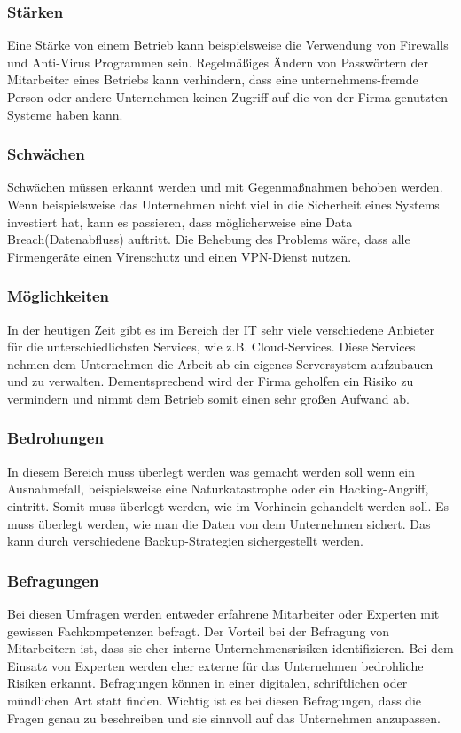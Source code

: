 \subsubsection{Stärken}
Eine Stärke von einem Betrieb kann beispielsweise die Verwendung von Firewalls und Anti-Virus Programmen sein. Regelmäßiges Ändern von Passwörtern der Mitarbeiter eines Betriebs kann verhindern, dass eine unternehmens-fremde Person oder andere Unternehmen keinen Zugriff auf die von der Firma genutzten Systeme haben kann.

\subsubsection{Schwächen}
Schwächen müssen erkannt werden und mit Gegenmaßnahmen behoben werden.
Wenn beispielsweise das Unternehmen nicht viel in die Sicherheit eines Systems investiert hat, kann es passieren, dass möglicherweise eine Data Breach(Datenabfluss) auftritt. Die Behebung des Problems wäre, dass alle Firmengeräte einen Virenschutz und einen VPN-Dienst nutzen.

\subsubsection{Möglichkeiten}
In der heutigen Zeit gibt es im Bereich der IT sehr viele verschiedene Anbieter für die unterschiedlichsten Services, wie z.B. Cloud-Services.
Diese Services nehmen dem Unternehmen die Arbeit ab ein eigenes Serversystem aufzubauen und zu verwalten. Dementsprechend wird der Firma geholfen ein Risiko zu vermindern und nimmt dem Betrieb somit einen sehr großen Aufwand ab. 

\subsubsection{Bedrohungen}
In diesem Bereich muss überlegt werden was gemacht werden soll wenn ein Ausnahmefall, beispielsweise eine Naturkatastrophe oder ein Hacking-Angriff, eintritt. Somit muss überlegt werden, wie im Vorhinein gehandelt werden soll. Es muss überlegt werden, wie man die Daten von dem Unternehmen sichert. Das kann durch verschiedene Backup-Strategien sichergestellt werden.


\subsubsection{Befragungen}
Bei diesen Umfragen werden entweder erfahrene Mitarbeiter oder Experten mit gewissen Fachkompetenzen befragt. Der Vorteil bei der Befragung von Mitarbeitern ist, dass sie eher interne Unternehmensrisiken identifizieren. Bei dem Einsatz von Experten werden eher externe für das Unternehmen bedrohliche Risiken erkannt. Befragungen können in einer digitalen, schriftlichen oder mündlichen Art statt finden.
Wichtig ist es bei diesen Befragungen, dass die Fragen genau zu beschreiben und sie sinnvoll auf das Unternehmen anzupassen.

